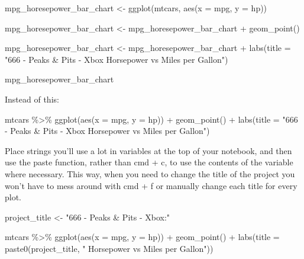 \documentclass[
  letterpaper,
  DIV=11,
  numbers=noendperiod]{scrreprt}
\newenvironment{Shaded}{\begin{snugshade}}{\end{snugshade}}
\newcommand{\AttributeTok}[1]{\textcolor[rgb]{0.40,0.45,0.13}{#1}}
\newcommand{\FunctionTok}[1]{\textcolor[rgb]{0.28,0.35,0.67}{#1}}
\newcommand{\NormalTok}[1]{\textcolor[rgb]{0.00,0.23,0.31}{#1}}
\newcommand{\OtherTok}[1]{\textcolor[rgb]{0.00,0.23,0.31}{#1}}
\newcommand{\SpecialCharTok}[1]{\textcolor[rgb]{0.37,0.37,0.37}{#1}}
\newcommand{\StringTok}[1]{\textcolor[rgb]{0.13,0.47,0.30}{#1}}
\begin{document}
\begin{Shaded}
\begin{Highlighting}[]
\NormalTok{mpg\_horesepower\_bar\_chart }\OtherTok{\textless{}{-}} \FunctionTok{ggplot}\NormalTok{(mtcars, }\FunctionTok{aes}\NormalTok{(}\AttributeTok{x =}\NormalTok{ mpg, }\AttributeTok{y =}\NormalTok{ hp))}

\NormalTok{mpg\_horesepower\_bar\_chart  }\OtherTok{\textless{}{-}}\NormalTok{ mpg\_horesepower\_bar\_chart  }\SpecialCharTok{+} \FunctionTok{geom\_point}\NormalTok{()}

\NormalTok{mpg\_horesepower\_bar\_chart  }\OtherTok{\textless{}{-}}\NormalTok{ mpg\_horesepower\_bar\_chart  }\SpecialCharTok{+} \FunctionTok{labs}\NormalTok{(}\AttributeTok{title =} \StringTok{"666 {-} Peaks \& Pits {-} Xbox Horsepower vs Miles per Gallon"}\NormalTok{)}

\NormalTok{mpg\_horesepower\_bar\_chart}
\end{Highlighting}
\end{Shaded}

Instead of this:

\begin{Shaded}
\begin{Highlighting}[]
\NormalTok{mtcars }\SpecialCharTok{\%\textgreater{}\%}
  \FunctionTok{ggplot}\NormalTok{(}\FunctionTok{aes}\NormalTok{(}\AttributeTok{x =}\NormalTok{ mpg, }\AttributeTok{y =}\NormalTok{ hp)) }\SpecialCharTok{+}
  \FunctionTok{geom\_point}\NormalTok{() }\SpecialCharTok{+}
  \FunctionTok{labs}\NormalTok{(}\AttributeTok{title =} \StringTok{"666 {-} Peaks \& Pits {-} Xbox Horsepower vs Miles per Gallon"}\NormalTok{)}
\end{Highlighting}
\end{Shaded}

Place strings you'll use a lot in variables at the top of your notebook,
and then use the paste function, rather than cmd + c, to use the
contents of the variable where necessary. This way, when you need to
change the title of the project you won't have to mess around with cmd +
f or manually change each title for every plot.

\begin{Shaded}
\begin{Highlighting}[]
\NormalTok{project\_title }\OtherTok{\textless{}{-}} \StringTok{"666 {-} Peaks \& Pits {-} Xbox:"}

\NormalTok{mtcars }\SpecialCharTok{\%\textgreater{}\%}
  \FunctionTok{ggplot}\NormalTok{(}\FunctionTok{aes}\NormalTok{(}\AttributeTok{x =}\NormalTok{ mpg, }\AttributeTok{y =}\NormalTok{ hp)) }\SpecialCharTok{+}
  \FunctionTok{geom\_point}\NormalTok{() }\SpecialCharTok{+}
  \FunctionTok{labs}\NormalTok{(}\AttributeTok{title =} \FunctionTok{paste0}\NormalTok{(project\_title, }\StringTok{" Horsepower vs Miles per Gallon"}\NormalTok{))}
\end{Highlighting}
\end{Shaded}
\end{document}
